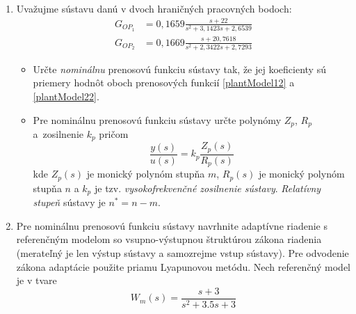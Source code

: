 ﻿\documentclass[a4paper, 10pt, ]{article}
\begin{document}
\begin{enumerate}

	\item Uvažujme sústavu danú v dvoch hraničných pracovných bodoch:
	\begin{align}
		G_{OP_1}
		&=
		0,1659 \frac{s + 22}{ s^2 + 3,1423 s + 2,6539}
		\label{plantModel12} \\
		G_{OP_2}
		&=
		0,1669 \frac{s + 20,7618}{s^2 + 2,3422s + 2,7293}
		\label{plantModel22}
	\end{align}
	\begin{itemize}
		\item Určte \emph{nominálnu} prenosovú funkciu sústavy tak, že jej koeficienty sú	priemery hodnôt oboch prenosových funkcií \eqref{plantModel12} a \eqref{plantModel22}.
		\item Pre nominálnu prenosovú funkciu sústavy určte polynómy $Z_p$, $R_p$ a~zosilnenie $k_p$ pričom
		\begin{equation} \label{C_PFsustavy_MRCp2}
			\frac{y(s)}{u(s)}
			=
			k_p
			\frac{Z_p(s)}{R_p(s)}
		\end{equation}
	kde $Z_p(s)$ je monický polynóm stupňa $m$, $R_p(s)$ je monický polynóm stupňa $n$ a $k_p$ je tzv. \emph{vysokofrekvenčné zosilnenie sústavy}. \emph{Relatívny stupeň} sústavy je $n^* = n - m$.
	\end{itemize}


	\item Pre nominálnu prenosovú funkciu sústavy navrhnite adaptívne riadenie s referenčným modelom so vsupno-výstupnou štruktúrou zákona riadenia (merateľný je len výstup sústavy a samozrejme vstup sústavy). Pre odvodenie zákona adaptácie použite priamu Lyapunovou metódu. Nech referenčný model je v tvare
	\begin{equation}
		W_m(s)
		=
		\frac{s + 3}{ s^2 + 3.5 s + 3}
	\end{equation}


\end{enumerate}
\end{document}
